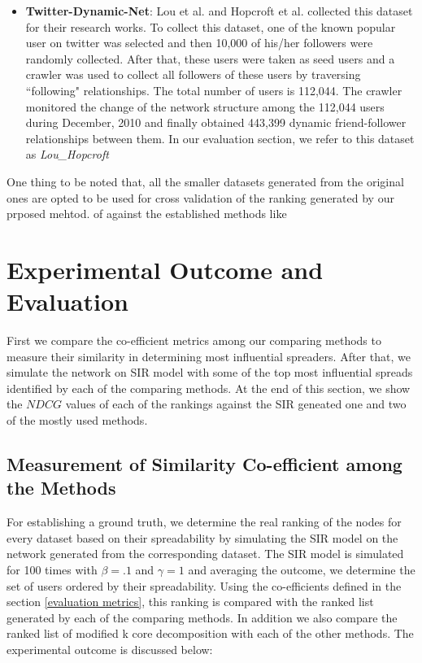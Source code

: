 \documentclass[sigconf]{acmart}
\begin{document}
\begin{itemize}
	\item \textbf{Twitter-Dynamic-Net}: Lou et al. \cite{lou2013learning} and Hopcroft et al. \cite{hopcroft2011will} collected this dataset for their research works. To collect this dataset, one of the known popular user on twitter was selected and then 10,000 of his/her followers were randomly collected. After that, these users were taken as seed users and a crawler was used to collect all followers of these users by traversing ``following" relationships. The total number of users is 112,044. The crawler monitored the change of the network structure among the 112,044 users during December, 2010 and finally obtained 443,399 dynamic friend-follower relationships between them. In our evaluation section, we refer to this dataset as \textit{Lou\_Hopcroft}
	
\end{itemize}

One thing to be noted that, all the smaller datasets generated from the original ones are opted to be used for cross validation of the ranking generated by our prposed mehtod. of against the established methods like 




\section{Experimental Outcome and Evaluation}

First we compare the co-efficient metrics among our comparing methods to measure their similarity in determining most influential spreaders. 
After that, we simulate the network on SIR model with some of the top most influential spreads identified by each of the comparing methods. At the end of this section, we show the $NDCG$ values of each of the rankings against the SIR geneated one and two of the mostly used methods.

\subsection{Measurement of Similarity Co-efficient among the Methods}
For establishing a ground truth, we determine the real ranking of the nodes for every dataset based on their spreadability by simulating the SIR model on the network generated from the corresponding dataset. The SIR model is simulated for 100 times with $\beta=.1$ and $\gamma=1$ and averaging the outcome, we determine the set of users ordered by their  spreadability. Using the co-efficients defined in the section \ref{evaluation metrics}, this ranking is compared with the ranked list generated by each of the comparing methods. In addition we also compare the ranked list of modified k core decomposition with each of the other methods. The experimental outcome is discussed below:
\end{document}
